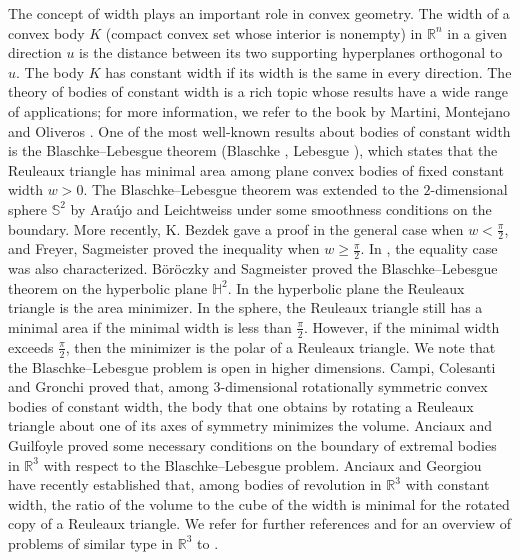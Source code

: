 \documentclass[12pt,reqno]{amsart}
\theoremstyle{remark}
\newcommand{\R}{{\mathbb R}}
\newcommand{\hyp}{{\mathbb H}}
\newcommand{\sph}{{\mathbb S}}
\begin{document}
The concept of width plays an important role in convex geometry. The width of a convex body $K$ (compact convex set whose interior is nonempty) in $\R^n$ in a given direction $u$ is the distance between its two supporting hyperplanes orthogonal to $u$. The body $K$ has constant width if its width is the same in every direction. The theory of bodies of constant width is a rich topic whose results have a wide range of applications; for more information, we refer to the book by Martini, Montejano and Oliveros \cite{MMO19}. One of the most well-known results about bodies of constant width is the Blaschke--Lebesgue theorem (Blaschke \cite{Bla15}, Lebesgue \cite{Leb14}), which states that the Reuleaux triangle has minimal area among plane convex bodies of fixed constant width $w>0$.  The Blaschke--Lebesgue theorem was extended to the $2$-dimensional sphere $\sph^2$ by Ara\'ujo \cite{A97} and Leichtweiss \cite{Lei05} under some smoothness conditions on the boundary. More recently, K. Bezdek \cite{Bez21} gave a proof in the general case when $w<\frac{\pi}{2}$, and Freyer, Sagmeister \cite{FS} proved the inequality when $w\geq\frac{\pi}{2}$. In \cite{FS}, the equality case was also characterized.
B\"or\"oczky and Sagmeister \cite{BoS22} proved the Blaschke--Lebesgue theorem on the hyperbolic plane $\hyp^2$. 
In the hyperbolic plane the Reuleaux triangle is the area minimizer. In the sphere, the Reuleaux triangle still has a minimal area if the minimal width is less than $\frac{\pi}2$. 
However, if the minimal width exceeds $\frac{\pi}2$, then the minimizer is the polar of a Reuleaux triangle. We note that the Blaschke--Lebesgue problem is open in higher dimensions. Campi, Colesanti and Gronchi \cite{CCG96} proved that, among $3$-dimensional rotationally symmetric convex bodies of constant width, the body that one obtains by rotating a Reuleaux triangle about one of its axes of symmetry minimizes the volume. 
Anciaux and Guilfoyle \cite{AB11} proved some necessary conditions on the boundary of extremal bodies in $\R^3$ with respect to the Blaschke--Lebesgue problem. Anciaux and Georgiou \cite{AG26} have recently established that, among bodies of revolution in $\R^3$ with constant width, the ratio of the volume to the cube of the width is minimal for the rotated copy of a Reuleaux triangle. We refer for further references and for an overview of problems of similar type in $\R^3$ to \cite{CCG96}.
\end{document}
